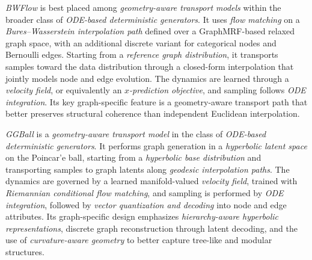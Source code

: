 \documentclass{article}
\begin{document}
\emph{BWFlow} \cite{bwflow} is best placed among \emph{geometry-aware transport models} within the broader class of \emph{ODE-based deterministic generators}. It uses \emph{flow matching} on a \emph{Bures--Wasserstein interpolation path} defined over a GraphMRF-based relaxed graph space, with an additional discrete variant for categorical nodes and Bernoulli edges. Starting from a \emph{reference graph distribution}, it transports samples toward the data distribution through a closed-form interpolation that jointly models node and edge evolution. The dynamics are learned through a \emph{velocity field}, or equivalently an \emph{$x$-prediction objective}, and sampling follows \emph{ODE integration}. Its key graph-specific feature is a geometry-aware transport path that better preserves structural coherence than independent Euclidean interpolation.

\emph{GGBall} \cite{ggball} is a \emph{geometry-aware transport model} in the class of \emph{ODE-based deterministic generators}. It performs graph generation in a \emph{hyperbolic latent space} on the Poincar'e ball, starting from a \emph{hyperbolic base distribution} and transporting samples to graph latents along \emph{geodesic interpolation paths}. The dynamics are governed by a learned manifold-valued \emph{velocity field}, trained with \emph{Riemannian conditional flow matching}, and sampling is performed by \emph{ODE integration}, followed by \emph{vector quantization and decoding} into node and edge attributes. Its graph-specific design emphasizes \emph{hierarchy-aware hyperbolic representations}, discrete graph reconstruction through latent decoding, and the use of \emph{curvature-aware geometry} to better capture tree-like and modular structures.
\end{document}
